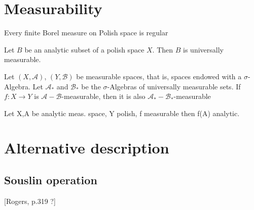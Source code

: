 \documentclass[10pt, a4paper, titlepage]{article}
\numberwithin{equation}{section}
\begin{document}


\section{Measurability}

\begin{definition}[$\mu$-Measurable]
	
\end{definition}

\begin{definition}
	
\end{definition}

\begin{theorem}
	Every finite Borel measure on Polish space is regular
\end{theorem}

\begin{theorem}
	Let $B$ be an analytic subset of a polish space $X$. Then $B$ is universally measurable.
\end{theorem}

\begin{theorem}
	Let $(X,\mathcal{A})$,  $\left( Y, \mathcal{B} \right) $ be measurable spaces, that is, spaces endowed with a $\sigma$-Algebra.  
	Let $\mathcal{A}_*$ and $\mathcal{B}_*$ be the $\sigma$-Algebras of universally measurable sets.
	If  $f:X \to Y$ is  $\mathcal{A}- \mathcal{B}$-measurable, then it is also $\mathcal{A}_*-\mathcal{B}_*$-measurable
\end{theorem}


\begin{definition}
	
\end{definition}

\begin{theorem}
	Let X,A be analytic meas. space, Y polish, f measurable then f(A) analytic.
\end{theorem}




\section{Alternative description}


\subsection{Souslin operation}
[Rogers, p.319 ?]
\end{document}
